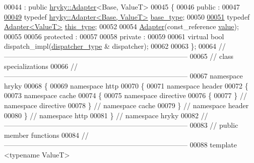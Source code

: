 \begin{DoxyCode}
00044     : \textcolor{keyword}{public} \hyperlink{classhryky_1_1_adapter}{hryky::Adapter}<Base, ValueT>
00045 \{
00046 \textcolor{keyword}{public} :
00047 
\hypertarget{http__header__cache__directive__adapter_8h_source_l00049}{}\hyperlink{classhryky_1_1http_1_1header_1_1cache_1_1directive_1_1_adapter_a3ed6b08c52097fceb6fcebf475554670}{00049}     \textcolor{keyword}{typedef} \hyperlink{classhryky_1_1_adapter}{hryky::Adapter<Base, ValueT>} \hyperlink{classhryky_1_1http_1_1header_1_1cache_1_1directive_1_1_adapter_a3ed6b08c52097fceb6fcebf475554670}{base_type};
00050 
\hypertarget{http__header__cache__directive__adapter_8h_source_l00051}{}\hyperlink{classhryky_1_1http_1_1header_1_1cache_1_1directive_1_1_adapter_ae4e3a627754a2a689982ce17e5fc5169}{00051}     \textcolor{keyword}{typedef} \hyperlink{classhryky_1_1http_1_1header_1_1cache_1_1directive_1_1_adapter}{Adapter<ValueT>} \hyperlink{classhryky_1_1http_1_1header_1_1cache_1_1directive_1_1_adapter_ae4e3a627754a2a689982ce17e5fc5169}{this_type};
00052 
00054     \hyperlink{classhryky_1_1_adapter_aad569390e8fc9963c8849cbd0c59bea9}{Adapter}(const\_reference \hyperlink{classhryky_1_1_adapter_ab736ecd30f215ca3cbd2364f818cb83f}{value});
00055 
00056 \textcolor{keyword}{protected} :
00057 
00058 \textcolor{keyword}{private} :
00059 
00061     \textcolor{keyword}{virtual} \textcolor{keywordtype}{bool} dispatch\_impl(\hyperlink{classhryky_1_1http_1_1header_1_1cache_1_1directive_1_1dispatcher_1_1_base}{dispatcher_type} & dispatcher);
00062 
00063 \};
00064 \textcolor{comment}{//
      ------------------------------------------------------------------------------}
00065 \textcolor{comment}{// class specializations}
00066 \textcolor{comment}{//
      ------------------------------------------------------------------------------}
00067 \textcolor{keyword}{namespace }hryky
00068 \{
00069 \textcolor{keyword}{namespace }http
00070 \{
00071 \textcolor{keyword}{namespace }header
00072 \{
00073 \textcolor{keyword}{namespace }cache
00074 \{
00075 \textcolor{keyword}{namespace }directive
00076 \{
00077 \} \textcolor{comment}{// namespace directive}
00078 \} \textcolor{comment}{// namespace cache}
00079 \} \textcolor{comment}{// namespace header}
00080 \} \textcolor{comment}{// namespace http}
00081 \} \textcolor{comment}{// namespace hryky}
00082 \textcolor{comment}{//
      ------------------------------------------------------------------------------}
00083 \textcolor{comment}{// public member functions}
00084 \textcolor{comment}{//
      ------------------------------------------------------------------------------}
00088 \textcolor{comment}{}\textcolor{keyword}{template} <\textcolor{keyword}{typename} ValueT>

\end{DoxyCode}
